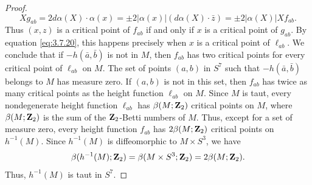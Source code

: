 \documentclass[10pt,a4paper]{amsart}
\begin{document}
\begin{proof}
\begin{equation} 
\label{eq:3.7.22}
Xg_{ab} = 2 d\alpha (X) \cdot \alpha (x) = \pm 2|\alpha (x)| (d\alpha (X)\cdot \bar{z}) = \pm 2|\alpha (X)| Xf_{ab}.
\end{equation}
Thus $(x,z)$ is a critical point of $f_{ab}$ if and only if $x$ is a critical point of $g_{ab}$.  By equation
\eqref{eq:3.7.20}, this happens precisely when $x$ is a critical point of $\ell_{ab}$.  We conclude that if 
$- h(\bar{a}, \bar{b})$ is not in $M$, then $f_{ab}$ has two critical points for every critical point of 
$\ell_{ab}$ on $M$.  The set of points $(a,b)$ in $S^7$ such that $- h(\bar{a}, \bar{b})$ belongs to $M$ has measure
zero.  If $(a,b)$ is not in this set, then $f_{ab}$ has twice as many critical points as the height function
$\ell_{ab}$ on $M$.  Since $M$ is taut, every nondegenerate 
height function $\ell_{ab}$ has $\beta (M;{\bf Z}_2)$ critical
points on $M$, where $\beta (M;{\bf Z}_2)$ is the sum of the 
${\bf Z}_2$-Betti numbers of $M$.  
Thus, except for a set of measure zero, every height function $f_{ab}$
has $2 \beta (M;{\bf Z}_2)$ critical points on $h^{-1}(M)$.  Since $h^{-1}(M)$ is diffeomorphic to $M \times S^3$,
we have 
\begin{displaymath}
\beta (h^{-1}(M);{\bf Z}_2) = \beta (M \times S^3;{\bf Z}_2) = 2 \beta (M;{\bf Z}_2).
\end{displaymath}
Thus, $h^{-1}(M)$ is taut in $S^7$. 
\end{proof}
\end{document}
